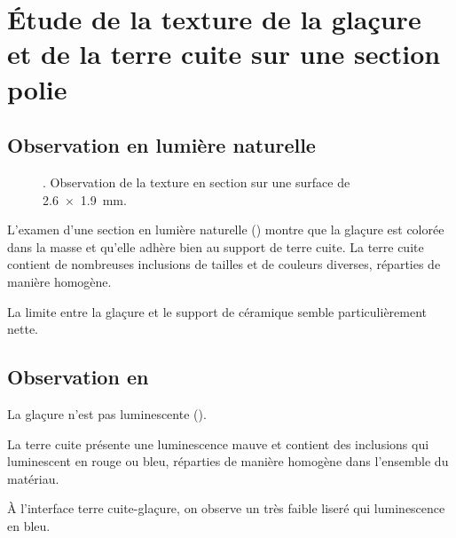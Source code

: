 \section{Étude de la texture de la glaçure et de la terre cuite sur 
         une section polie}

\subsection{Observation en lumière naturelle}
\begin{figure}[htb]
  \begin{minipage}[t]{0.48\textwidth}
  \end{minipage}%
  \hfill%
  \begin{minipage}[t]{0.48\textwidth}
    \subcaption{\CL \label{texture:6528_CL}}
  \end{minipage}
  \caption[\ -- Observation de la texture en section]
          {\legendeA.
           Observation de la texture en section 
           sur une surface de \SI{2.6x1.9}{\mm}.}
  \label{texture:6528}
\end{figure}

L'examen d'une section en lumière naturelle 
() montre que la glaçure est colorée dans 
la masse et qu'elle adhère bien au support de terre cuite. La terre 
cuite contient de nombreuses inclusions de tailles et de couleurs 
diverses, réparties de manière homogène.

La limite entre la glaçure et le support de céramique semble 
particulièrement nette.

\subsection{Observation en \CL}
La glaçure n'est pas luminescente ().

La terre cuite présente une luminescence mauve et contient des 
inclusions qui luminescent en rouge ou bleu, réparties de manière 
homogène dans l'ensemble du matériau.

À l'interface terre cuite-glaçure, on observe un très faible liseré 
qui luminescence en bleu.

